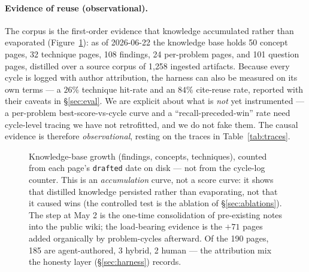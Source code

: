 \documentclass[11pt]{article}
\begin{document}
\paragraph{Evidence of reuse (observational).}
The corpus is the first-order evidence that knowledge accumulated rather than evaporated
(Figure~\ref{fig:kb-growth}): as
of 2026-06-22 the knowledge base holds 50 concept pages, 32 technique pages, 108 findings, 24
per-problem pages, and 101 question pages, distilled over a source corpus of 1{,}258 ingested
artifacts. Because every cycle is logged with author attribution, the harness can also be
measured on its own terms --- a $26\%$ technique hit-rate and an $84\%$ cite-reuse rate,
reported with their caveats in \S\ref{sec:eval}. We are explicit about what is \emph{not}
yet instrumented --- a per-problem best-score-vs-cycle curve and a ``recall-preceded-win''
rate need cycle-level tracing we have not retrofitted, and we do not fake them. The causal
evidence is therefore \emph{observational}, resting on the traces in Table~\ref{tab:traces}.

\begin{figure}[htbp]
\centering
{}
\caption{Knowledge-base growth (findings, concepts, techniques), counted from each page's
  \texttt{drafted} date on disk --- not from the cycle-log counter. This is an
  \emph{accumulation} curve, not a score curve: it shows that distilled knowledge persisted
  rather than evaporating, not that it caused wins (the controlled test is the ablation of
  \S\ref{sec:ablations}). The step at May 2 is the one-time consolidation of pre-existing notes
  into the public wiki; the load-bearing evidence is the $+71$ pages added organically by
  problem-cycles afterward. Of the 190 pages, 185 are agent-authored, 3 hybrid, 2 human ---
  the attribution mix the honesty layer (\S\ref{sec:harness}) records.}
\label{fig:kb-growth}
\end{figure}
\end{document}
